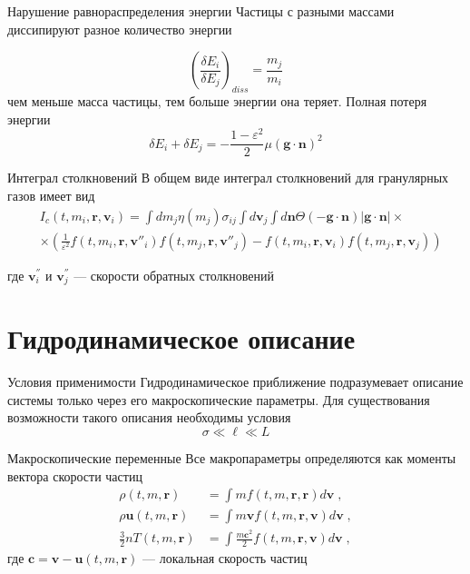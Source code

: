 \documentclass[10pt]{beamer}
\newcommand{\br}{\bm{r}}
\newcommand{\bv}{\bm{v}}
\newcommand{\bu}{\bm{u}}
\newcommand{\bc}{\bm{c}}
\newcommand{\eps}{\varepsilon}
\newcommand{\bg}{\bm{g}}
\newcommand{\bn}{\bm{n}}
\begin{document}
\begin{frame}[fragile]{Нарушение равнораспределения энергии}
  Частицы с разными массами диссипируют разное количество энергии

  \begin{equation}
    \left(\frac{\delta E_i}{\delta E_j}\right)_{diss}=\frac{m_j}{m_i}
  \end{equation}
  чем \alert{меньше} масса частицы, тем \alert{больше} энергии она теряет. Полная потеря энергии
  \begin{equation}
    \delta E_i+\delta E_j=-\frac{1-\eps^2}{2}\mu(\bg\cdot\bn)^2
  \end{equation}

\end{frame}

\begin{frame}[fragile]{Интеграл столкновений}
  В общем виде интеграл столкновений для гранулярных газов имеет вид
  \begin{equation}
    \begin{split}
      &I_c(t,m_i,\br,\bv_i) = \int dm_j\eta(m_j)\sigma_{ij}\int d\bv_j\int d\bn\Theta(-\bg\cdot\bn)\vert\bg\cdot\bn\vert\times\\
      &\times\left(\frac{1}{\eps^2}f(t,m_i,\br,\bv''_i)f(t,m_j,\br,\bv''_j)-f(t,m_i,\br,\bv_i)f(t,m_j,\br,\bv_j)\right)
    \end{split}
  \end{equation}

  где $\bv^{''}_i$ и $\bv^{''}_j$ --- скорости обратных столкновений
\end{frame}

\section{Гидродинамическое описание}

\begin{frame}[fragile]{Условия применимости}
  Гидродинамическое приближение подразумевает описание системы только через его \alert{макроскопические} параметры.
  Для существования возможности такого описания необходимы условия
  \begin{equation}
    \sigma\ll\ell\ll L
  \end{equation}
\end{frame}

\begin{frame}[fragile]{Макроскопические переменные}
  Все макропараметры определяются как моменты вектора скорости частиц
  \begin{equation}
    \begin{split}
      \rho(t,m,\br) &= \int mf(t,m,\br,\br)d\bv\;,\\
      \rho\bu(t,m,\br) &= \int m\bv f(t,m,\br,\bv)d\bv\;,\\
      \frac{3}{2}nT(t,m,\br) &= \int \frac{m\bc^2}{2}f(t,m,\br,\bv)d\bv\;,
    \end{split}
  \end{equation}
  где $\bc=\bv-\bu(t,m,\br)$ --- локальная скорость частиц
\end{frame}
\end{document}
